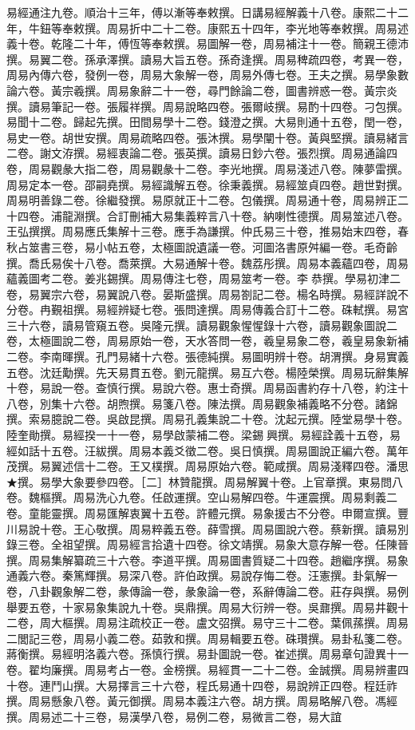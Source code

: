 \begin{pinyinscope}
易經通注九卷。順治十三年，傅以漸等奉敕撰。日講易經解義十八卷。康熙二十二年，牛鈕等奉敕撰。周易折中二十二卷。康熙五十四年，李光地等奉敕撰。周易述義十卷。乾隆二十年，傅恆等奉敕撰。易圖解一卷，周易補注十一卷。簡親王德沛撰。易翼二卷。孫承澤撰。讀易大旨五卷。孫奇逢撰。周易稗疏四卷，考異一卷，周易內傳六卷，發例一卷，周易大象解一卷，周易外傳七卷。王夫之撰。易學象數論六卷。黃宗羲撰。周易象辭二十一卷，尋門餘論二卷，圖書辨惑一卷。黃宗炎撰。讀易筆記一卷。張履祥撰。周易說略四卷。張爾岐撰。易酌十四卷。刁包撰。易聞十二卷。歸起先撰。田間易學十二卷。錢澄之撰。大易則通十五卷，閏一卷，易史一卷。胡世安撰。周易疏略四卷。張沐撰。易學闡十卷。黃與堅撰。讀易緒言二卷。謝文洊撰。易經衷論二卷。張英撰。讀易日鈔六卷。張烈撰。周易通論四卷，周易觀彖大指二卷，周易觀彖十二卷。李光地撰。周易淺述八卷。陳夢雷撰。周易定本一卷。邵嗣堯撰。易經識解五卷。徐秉義撰。易經筮貞四卷。趙世對撰。周易明善錄二卷。徐繼發撰。易原就正十二卷。包儀撰。周易通十卷，周易辨正二十四卷。浦龍淵撰。合訂刪補大易集義粹言八十卷。納喇性德撰。周易筮述八卷。王弘撰撰。周易應氏集解十三卷。應手為謙撰。仲氏易三十卷，推易始末四卷，春秋占筮書三卷，易小帖五卷，太極圖說遺議一卷。河圖洛書原舛編一卷。毛奇齡撰。喬氏易俟十八卷。喬萊撰。大易通解十卷。魏荔彤撰。周易本義蘊四卷，周易蘊義圖考二卷。姜兆錫撰。周易傳注七卷，周易筮考一卷。李恭撰。學易初津二卷，易翼宗六卷，易翼說八卷。晏斯盛撰。周易劄記二卷。楊名時撰。易經詳說不分卷。冉覲祖撰。易經辨疑七卷。張問達撰。周易傳義合訂十二卷。硃軾撰。易宮三十六卷，讀易管窺五卷。吳隆元撰。讀易觀象惺惺錄十六卷，讀易觀象圖說二卷，太極圖說二卷，周易原始一卷，天水答問一卷，羲皇易象二卷，羲皇易象新補二卷。李南暉撰。孔門易緒十六卷。張德純撰。易圖明辨十卷。胡渭撰。身易實義五卷。沈廷勱撰。先天易貫五卷。劉元龍撰。易互六卷。楊陸榮撰。周易玩辭集解十卷，易說一卷。查慎行撰。易說六卷。惠士奇撰。周易函書約存十八卷，約注十八卷，別集十六卷。胡煦撰。易箋八卷。陳法撰。周易觀象補義略不分卷。諸錦撰。索易臆說二卷。吳啟昆撰。周易孔義集說二十卷。沈起元撰。陸堂易學十卷。陸奎勛撰。易經揆一十一卷，易學啟蒙補二卷。梁錫興撰。易經詮義十五卷，易經如話十五卷。汪紱撰。周易本義爻徵二卷。吳日慎撰。周易圖說正編六卷。萬年茂撰。易翼述信十二卷。王又樸撰。周易原始六卷。範咸撰。周易淺釋四卷。潘思★撰。易學大象要參四卷。［二］林贊龍撰。周易解翼十卷。上官章撰。東易問八卷。魏樞撰。周易洗心九卷。任啟運撰。空山易解四卷。牛運震撰。周易剩義二卷。童能靈撰。周易匯解衷翼十五卷。許體元撰。易象援古不分卷。申爾宣撰。豐川易說十卷。王心敬撰。周易粹義五卷。薛雪撰。周易圖說六卷。蔡新撰。讀易別錄三卷。全祖望撰。周易經言拾遺十四卷。徐文靖撰。易象大意存解一卷。任陳晉撰。周易集解纂疏三十六卷。李道平撰。周易圖書質疑二十四卷。趙繼序撰。易象通義六卷。秦篤輝撰。易深八卷。許伯政撰。易說存悔二卷。汪憲撰。卦氣解一卷，八卦觀象解二卷，彖傳論一卷，彖象論一卷，系辭傳論二卷。莊存與撰。易例舉要五卷，十家易象集說九十卷。吳鼎撰。周易大衍辨一卷。吳鼐撰。周易井觀十二卷，周大樞撰。周易注疏校正一卷。盧文弨撰。易守三十二卷。葉佩蓀撰。周易二閭記三卷，周易小義二卷。茹敦和撰。周易輯要五卷。硃瓚撰。易卦私箋二卷。蔣衡撰。易經明洛義六卷。孫慎行撰。易卦圖說一卷。崔述撰。周易章句證異十一卷。翟均廉撰。周易考占一卷。金榜撰。易經貫一二十二卷。金誠撰。周易辨畫四十卷。連鬥山撰。大易擇言三十六卷，程氏易通十四卷，易說辨正四卷。程廷祚撰。周易懸象八卷。黃元御撰。周易本義注六卷。胡方撰。周易略解八卷。馮經撰。周易述二十三卷，易漢學八卷，易例二卷，易微言二卷，易大誼
\end{pinyinscope}
